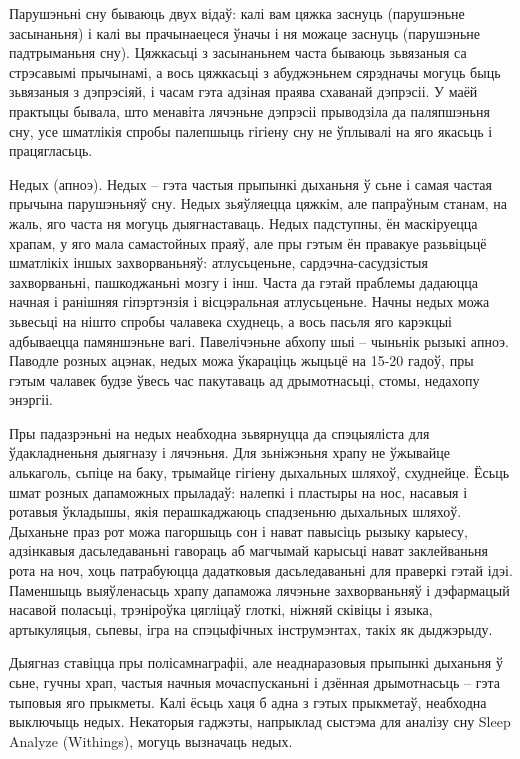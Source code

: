Парушэньні сну бываюць двух відаў: калі вам цяжка заснуць (парушэньне засынаньня) і калі вы прачынаецеся ўначы і ня можаце заснуць (парушэньне падтрыманьня сну). Цяжкасьці з засынаньнем часта бываюць зьвязаныя са стрэсавымі прычынамі, а вось цяжкасьці з абуджэньнем сярэдначы могуць быць зьвязаныя з дэпрэсіяй, і часам гэта адзіная праява схаванай дэпрэсіі. У маёй практыцы бывала, што менавіта лячэньне дэпрэсіі прыводзіла да паляпшэньня сну, усе шматлікія спробы палепшыць гігіену сну не ўплывалі на яго якасьць і працягласьць.

Недых (апноэ). Недых – гэта частыя прыпынкі дыханьня ў сьне і самая частая прычына парушэньняў сну. Недых зьяўляецца цяжкім, але папраўным станам, на жаль, яго часта ня могуць дыягнаставаць. Недых падступны, ён маскіруецца храпам, у яго мала самастойных праяў, але пры гэтым ён правакуе разьвіцьцё шматлікіх іншых захворваньняў: атлусьценьне, сардэчна-сасудзістыя захворваньні, пашкоджаньні мозгу і інш. Часта да гэтай праблемы дадаюцца начная і ранішняя гіпэртэнзія і вісцэральная атлусьценьне. Начны недых можа зьвесьці на нішто спробы чалавека схуднець, а вось пасьля яго карэкцыі адбываецца памяншэньне вагі. Павелічэньне абхопу шыі – чыньнік рызыкі апноэ. Паводле розных ацэнак, недых можа ўкараціць жыцьцё на 15-20 гадоў, пры гэтым чалавек будзе ўвесь час пакутаваць ад дрымотнасьці, стомы, недахопу энэргіі.

Пры падазрэньні на недых неабходна зьвярнуцца да спэцыяліста для ўдакладненьня дыягназу і лячэньня. Для зьніжэньня храпу не ўжывайце алькаголь, сьпіце на баку, трымайце гігіену дыхальных шляхоў, схуднейце. Ёсьць шмат розных дапаможных прыладаў: налепкі і пластыры на нос, насавыя і ротавыя ўкладышы, якія перашкаджаюць спадзеньню дыхальных шляхоў. Дыханьне праз рот можа пагоршыць сон і нават павысіць рызыку карыесу, адзінкавыя дасьледаваньні гавораць аб магчымай карысьці нават заклейваньня рота на ноч, хоць патрабуюцца дадатковыя дасьледаваньні для праверкі гэтай ідэі. Паменшыць выяўленасьць храпу дапаможа лячэньне захворваньняў і дэфармацый насавой поласьці, трэніроўка цягліцаў глоткі, ніжняй сківіцы і языка, артыкуляцыя, сьпевы, ігра на спэцыфічных інструмэнтах, такіх як дыджэрыду.

Дыягназ ставіцца пры полісамнаграфіі, але неаднаразовыя прыпынкі дыханьня ў сьне, гучны храп, частыя начныя мочаспусканьні і дзённая дрымотнасьць – гэта тыповыя яго прыкметы. Калі ёсьць хаця б адна з гэтых прыкметаў, неабходна выключыць недых. Некаторыя гаджэты, напрыклад сыстэма для аналізу сну Sleep Analyze (Withings), могуць вызначаць недых.

